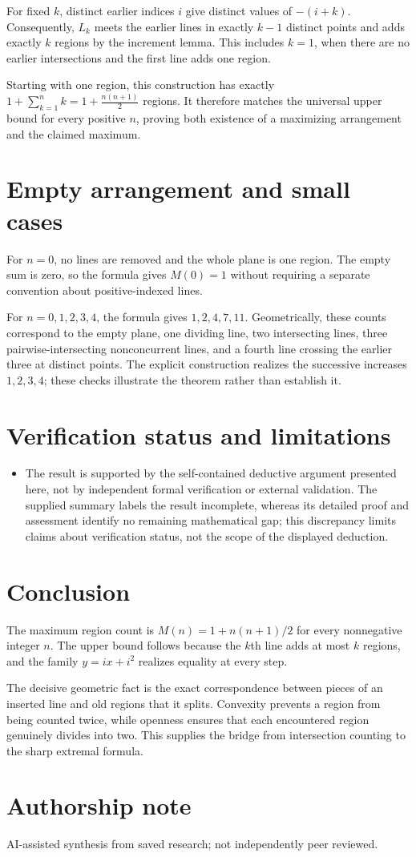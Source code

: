 \documentclass[11pt]{article}
\begin{document}
For fixed $k$, distinct earlier indices $i$ give distinct values of $-(i+k)$. Consequently, $L_k$ meets the earlier lines in exactly $k-1$ distinct points and adds exactly $k$ regions by the increment lemma. This includes $k=1$, when there are no earlier intersections and the first line adds one region.

Starting with one region, this construction has exactly $1+\sum_{k=1}^{n}k=1+\frac{n(n+1)}{2}$ regions. It therefore matches the universal upper bound for every positive $n$, proving both existence of a maximizing arrangement and the claimed maximum.

\section{Empty arrangement and small cases}
For $n=0$, no lines are removed and the whole plane is one region. The empty sum is zero, so the formula gives $M(0)=1$ without requiring a separate convention about positive-indexed lines.

For $n=0,1,2,3,4$, the formula gives $1,2,4,7,11$. Geometrically, these counts correspond to the empty plane, one dividing line, two intersecting lines, three pairwise-intersecting nonconcurrent lines, and a fourth line crossing the earlier three at distinct points. The explicit construction realizes the successive increases $1,2,3,4$; these checks illustrate the theorem rather than establish it.

\section{Verification status and limitations}
\begin{itemize}
\item The result is supported by the self-contained deductive argument presented here, not by independent formal verification or external validation. The supplied summary labels the result incomplete, whereas its detailed proof and assessment identify no remaining mathematical gap; this discrepancy limits claims about verification status, not the scope of the displayed deduction.
\end{itemize}
\section{Conclusion}
The maximum region count is $M(n)=1+n(n+1)/2$ for every nonnegative integer $n$. The upper bound follows because the $k$th line adds at most $k$ regions, and the family $y=ix+i^2$ realizes equality at every step.

The decisive geometric fact is the exact correspondence between pieces of an inserted line and old regions that it splits. Convexity prevents a region from being counted twice, while openness ensures that each encountered region genuinely divides into two. This supplies the bridge from intersection counting to the sharp extremal formula.

\section*{Authorship note}
AI-assisted synthesis from saved research; not independently peer reviewed.
\end{document}
